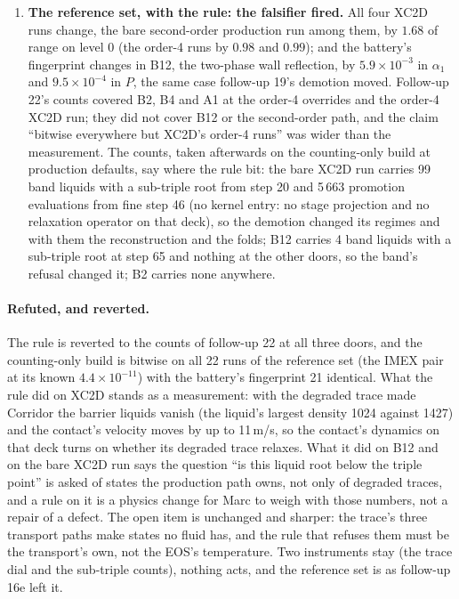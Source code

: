 \documentclass[11pt,a4paper]{article}
\begin{document}
\begin{enumerate}[nosep]
      $8$ and $11.5$\,m/s ($0.72$ and $0.98$ of range), $\alpha_1$ by
      $0.11$, $P$ by $6.1$\,bar, $T$ by 43\,K; the pressure and density
      ranges of the whole field are identical to the record's and the
      run is sound.  The contact's own dynamics on this deck depends on
      whether its degraded trace relaxes at all.
\item \textbf{The reference set, with the rule: the falsifier fired.}
      All four XC2D runs change, the bare second-order production run
      among them, by $1.68$ of range on level 0 (the order-4 runs by
      $0.98$ and $0.99$); and the battery's fingerprint changes in B12,
      the two-phase wall reflection, by $5.9\times10^{-3}$ in $\alpha_1$
      and $9.5\times10^{-4}$ in $P$, the same case follow-up 19's
      demotion moved.  Follow-up 22's counts covered B2, B4 and A1 at
      the order-4 overrides and the order-4 XC2D run; they did not cover
      B12 or the second-order path, and the claim ``bitwise everywhere
      but XC2D's order-4 runs'' was wider than the measurement.  The counts, taken afterwards on the counting-only build at
      production defaults, say where the rule bit: the bare XC2D run
      carries 99 band liquids with a sub-triple root from step 20 and
      5\,663 promotion evaluations from fine step 46 (no kernel entry: no
      stage projection and no relaxation operator on that deck), so the
      demotion changed its regimes and with them the reconstruction and
      the folds; B12 carries 4 band liquids with a sub-triple root at
      step 65 and nothing at the other doors, so the band's refusal
      changed it; B2 carries none anywhere.
\end{enumerate}

\paragraph{Refuted, and reverted.}  The rule is reverted to the
counts of follow-up 22 at all three doors, and the counting-only build is bitwise on all 22 runs of the reference set (the IMEX pair at its known $4.4\times10^{-11}$) with the battery's fingerprint 21 identical.  What the rule
did on XC2D stands as a measurement: with the degraded trace made
Corridor the barrier liquids vanish (the liquid's largest density 1024
against 1427) and the contact's velocity moves by up to 11\,m/s, so the
contact's dynamics on that deck turns on whether its degraded trace
relaxes.  What it did on B12 and on the bare XC2D run says the
question ``is this liquid root below the triple point'' is asked of
states the production path owns, not only of degraded traces, and a
rule on it is a physics change for Marc to weigh with those numbers,
not a repair of a defect.  The open item is unchanged and sharper:
the trace's three transport paths make states no fluid has, and the
rule that refuses them must be the transport's own, not the EOS's
temperature.  Two instruments stay (the trace dial and the sub-triple
counts), nothing acts, and the reference set is as follow-up 16e left
it.
\end{document}
